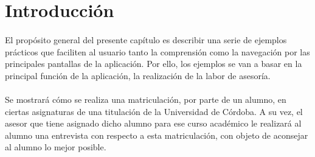 \section{Introducción}

  \paragraph{}El propósito general del presente capítulo es describir una serie
  de ejemplos prácticos que faciliten al usuario tanto la comprensión como la
  navegación por las principales pantallas de la aplicación. Por ello, los
  ejemplos se van a basar en la principal función de la aplicación, la
  realización de la labor de asesoría.

  \paragraph{}Se mostrará cómo se realiza una matriculación, por parte de un
  alumno, en ciertas asignaturas de una titulación de la Universidad de Córdoba.
  A su vez, el asesor que tiene asignado dicho alumno para ese curso académico
  le realizará al alumno una entrevista con respecto a esta matriculación, con
  objeto de aconsejar al alumno lo mejor posible.
